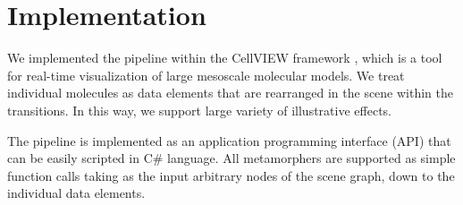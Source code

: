 \section{Implementation}

We implemented the pipeline within the CellVIEW framework \cite{muzic15}, which is a tool for real-time visualization of large mesoscale molecular models. We treat individual molecules as data elements that are rearranged in the scene within the transitions. In this way, we support large variety of illustrative effects.

The pipeline is implemented as an application programming interface (API) that can be easily scripted in C\# language. All metamorphers are supported as simple function calls taking as the input arbitrary nodes of the scene graph, down to the individual data elements.



